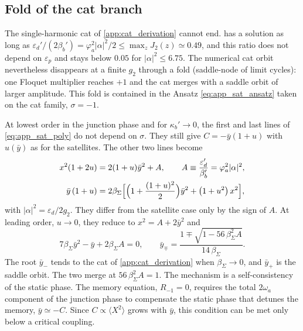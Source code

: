 
\subsection{Fold of the cat branch}
\label{app:cat_fold}

The single-harmonic cat of \cref{app:cat_derivation} cannot end.  has a solution as long as $\varepsilon_d'/(2\beta_b') = \varphi_a^2|\alpha|^2/2 \le \max_z J_2(z)\simeq0.49$, and this ratio does not depend on $\varepsilon_p$ and stays below $0.05$ for $|\alpha|^2\le6.75$.
The numerical cat orbit nevertheless disappears at a finite $g_2$ through a fold (saddle-node of limit cycles): one Floquet multiplier reaches $+1$ and the cat merges with a saddle orbit of larger amplitude.
This fold is contained in the Ansatz \cref{eq:app_sat_ansatz} taken on the cat family, $\sigma=-1$.

At lowest order in the junction phase and for $\kappa_b'\to0$, the first and last lines of \cref{eq:app_sat_poly} do not depend on $\sigma$. They still give $C=-\bar y(1+u)$ with $u(\bar y)$ as for the satellites. The other two lines become
\begin{equation}
\begin{split}
    x^2(1+2u) &= 2(1+u)\bar y^2 + A,\qquad A \equiv \frac{\varepsilon_d'}{\beta_b'} = \varphi_a^2|\alpha|^2,\\
    \bar y\,(1+u) &= 2\beta_\Sigma\Bigl[\Bigl(1+\frac{(1+u)^2}{2}\Bigr)\bar y^2 + \bigl(1+u^2\bigr)\,x^2\Bigr],
\end{split}
\label{eq:app_cat_fold_system}
\end{equation}
with $|\alpha|^2=\varepsilon_d/2g_2$. They differ from the satellite case only by the sign of $A$.
At leading order, $u\to0$, they reduce to $x^2=A+2\bar y^2$ and
\begin{equation}
    7\beta_\Sigma\bar y^2 - \bar y + 2\beta_\Sigma A = 0,
    \qquad
    \bar y_\mp = \frac{1\mp\sqrt{1-56\,\beta_\Sigma^2A}}{14\,\beta_\Sigma}.
\end{equation}
The root $\bar y_-$ tends to the cat of \cref{app:cat_derivation} when $\beta_\Sigma\to0$, and $\bar y_+$ is the saddle orbit. The two merge at $56\,\beta_\Sigma^2A=1$.
The mechanism is a self-consistency of the static phase. The memory equation, $R_{-1}=0$, requires the total $2\omega_a$ component of the junction phase to compensate the static phase that detunes the memory, $\bar y\simeq-C$.
Since $C\propto\langle X^2\rangle$ grows with $\bar y$, this condition can be met only below a critical coupling.

